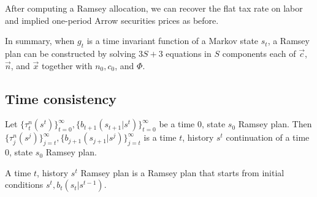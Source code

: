 \noindent After computing a Ramsey allocation, we can recover the flat tax rate on labor and implied one-period Arrow securities
prices as before.

%
%



In summary,  when $g_t$ is a time invariant function of a Markov state $s_t$, a Ramsey plan can be constructed
 by solving $3S +3$ equations in $S$ components each of  $\vec c$, $\vec n$, and $\vec x$
together with
$n_0, c_0$, and $\Phi$.











\subsection{Time consistency}

  Let  $\{\tau_t^n(s^t)\}_{t=0}^\infty, \{b_{t+1}(s_{t+1}| s^t)\}_{t=0}^\infty$ be a  time $0$, state $s_0$ Ramsey plan.
Then $\{\tau_j^n(s^j)\}_{j=t}^\infty, \{b_{j+1}(s_{j+1}| s^j)\}_{j=t}^\infty$ is a  time $t$, history $s^t$
  continuation of a time $0$, state $s_0$  Ramsey plan.


\medskip
{} A time $t$, history $s^t$  Ramsey plan is a Ramsey plan  that starts from initial conditions $s^t, b_t(s_t|s^{t-1})$.


\medskip

